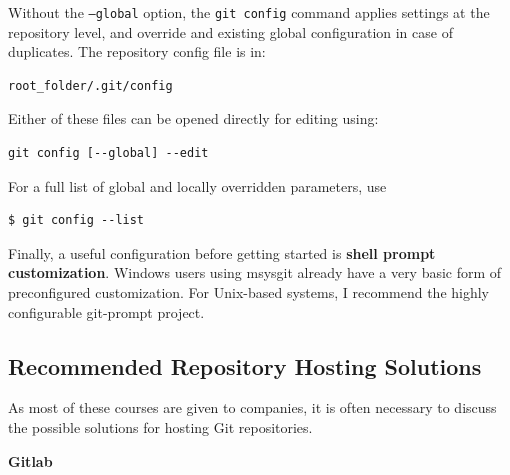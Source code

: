 \documentclass{../../common/tufte-latex/tufte-handout}
\begin{document}
Without the \texttt{--global} option, the \texttt{git config} command applies settings at the repository level, and override and existing global configuration in case of duplicates. The repository config file is in:

\begin{lstlisting}[style=BashInputStyle]
  root_folder/.git/config
\end{lstlisting}

\noindent Either of these files can be opened directly for editing using: 

\begin{lstlisting}[style=BashInputStyle]
  git config [--global] --edit
\end{lstlisting}

\noindent For a full list of global and locally overridden parameters, use

\begin{lstlisting}[style=BashInputStyle]
  $ git config --list
\end{lstlisting}

Finally, a useful configuration before getting started is \textbf{shell prompt customization}.
Windows users using msysgit already have a very basic form of preconfigured customization. 
For Unix-based systems, I recommend the highly configurable git-prompt project. 


\subsection{Recommended Repository Hosting Solutions}

As most of these courses are given to companies, it is often necessary to discuss the possible solutions for hosting Git repositories.

\textbf{Gitlab}
\end{document}

